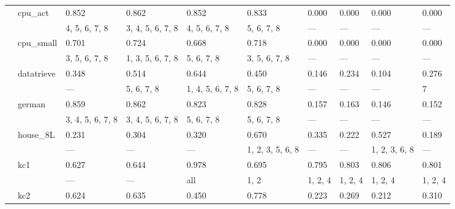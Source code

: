 \documentclass{article}
\begin{document}
\begin{center}
\begin{longtable}{p{1.2cm}p{1.8cm}p{1cm}p{1cm}p{1cm}p{1cm}p{1cm}p{1cm}p{1cm}p{1cm}}
             & cpu\_act      & 0.852            & 0.862            & 0.852            & 0.833            & 0.000      & 0.000         & 0.000         & 0.000         \\
             &              & 4, 5, 6, 7, 8    & 3, 4, 5, 6, 7, 8 & 4, 5, 6, 7, 8    & 5, 6, 7, 8       & ---        & ---           & ---           & ---           \\
             & cpu\_small    & 0.701            & 0.724            & 0.668            & 0.718            & 0.000      & 0.000         & 0.000         & 0.000         \\
             &              & 3, 5, 6, 7, 8    & 1, 3, 5, 6, 7, 8 & 5, 6, 7, 8       & 3, 5, 6, 7, 8    & ---        & ---           & ---           & ---           \\
             & datatrieve   & 0.348            & 0.514            & 0.644            & 0.450            & 0.146      & 0.234         & 0.104         & 0.276         \\
             &              & ---              & 5, 6, 7, 8       & 1, 4, 5, 6, 7, 8 & 5, 6, 7, 8       & ---        & ---           & ---           & 7             \\
             & german       & 0.859            & 0.862            & 0.823            & 0.828            & 0.157      & 0.163         & 0.146         & 0.152         \\
             &              & 3, 4, 5, 6, 7, 8 & 3, 4, 5, 6, 7, 8 & 5, 6, 7, 8       & 5, 6, 7, 8       & ---        & ---           & ---           & ---           \\
             & house\_8L     & 0.231            & 0.304            & 0.320            & 0.670            & 0.335      & 0.222         & 0.527         & 0.189         \\
             &              & ---              & ---              & ---              & 1, 2, 3, 5, 6, 8 & ---        & ---           & 1, 2, 3, 6, 8 & ---           \\
             & kc1          & 0.627            & 0.644            & 0.978            & 0.695            & 0.795      & 0.803         & 0.806         & 0.801         \\
             &              & ---              & ---              & all              & 1, 2             & 1, 2, 4    & 1, 2, 4       & 1, 2, 4       & 1, 2, 4       \\
             & kc2          & 0.624            & 0.635            & 0.450            & 0.778            & 0.223      & 0.269         & 0.212         & 0.310         \\

\end{longtable}
\end{center}
\end{document}
